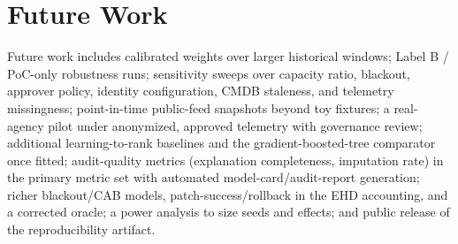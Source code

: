 \section{Future Work}

Future work includes calibrated weights over larger historical windows; Label B /
PoC-only robustness runs; sensitivity sweeps over capacity ratio, blackout,
approver policy, identity configuration, CMDB staleness, and telemetry missingness;
point-in-time public-feed snapshots beyond toy fixtures; a real-agency pilot under
anonymized, approved telemetry with governance review; additional learning-to-rank
baselines and the gradient-boosted-tree comparator once fitted; audit-quality
metrics (explanation completeness, imputation rate) in the primary metric set with
automated model-card/audit-report generation; richer blackout/CAB models,
patch-success/rollback in the EHD accounting, and a corrected oracle; a power
analysis to size seeds and effects; and public release of the reproducibility
artifact.
